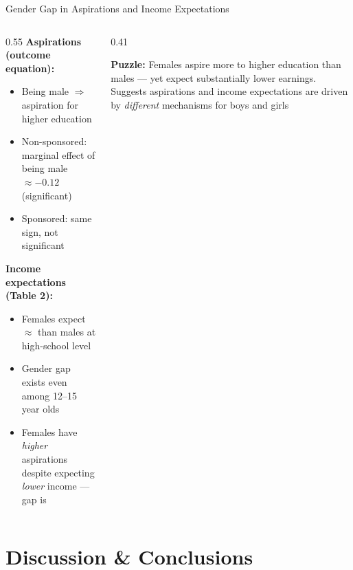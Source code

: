 \documentclass[aspectratio=169, 10pt]{beamer}
\begin{document}
\begin{frame}{Gender Gap in Aspirations and Income Expectations}
  \begin{columns}
    \begin{column}{0.55\textwidth}
      \textbf{Aspirations (outcome equation):}
      \begin{itemize}
        \item Being male $\Rightarrow$  aspiration for higher education
        \item Non-sponsored: marginal effect of being male $\approx -0.12$ (significant)
        \item Sponsored: same sign, not significant
      \end{itemize}

      \vspace{0.5em}
      \textbf{Income expectations (Table 2):}
      \begin{itemize}
        \item Females expect $\approx$ than males at high-school level
        \item Gender gap exists even among 12--15 year olds
        \item Females have \textit{higher} aspirations despite expecting \textit{lower} income — gap is 
      \end{itemize}
    \end{column}
    \begin{column}{0.41\textwidth}
      \begin{resultbox}
        \textbf{Puzzle:} Females aspire more to higher education than males — yet expect substantially lower earnings. Suggests aspirations and income expectations are driven by \textit{different} mechanisms for boys and girls
      \end{resultbox}
    \end{column}
  \end{columns}
\end{frame}

\section{Discussion \& Conclusions}
\end{document}
